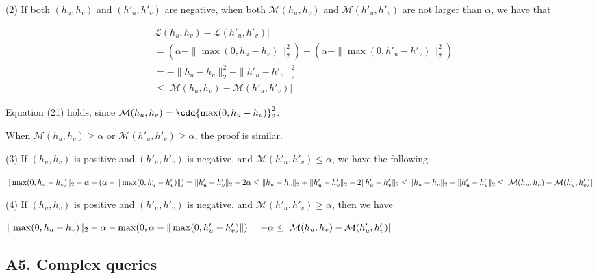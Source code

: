 \stab
(2) If both $(h_u,h_v)$ and $(h'_u,h'_v)$ are negative,
when both ${\mathcal M}(h_u,h_v)$
and ${\mathcal M}(h'_u,h'_v)$ are not larger than 
$\alpha$, we have that 

\begin{align*}
&{\mathcal L}(h_u,h_v)-{\mathcal L}(h'_u,h'_v)|\\
&=(\alpha -\|\max(0,h_u-h_v)\|^2_2) - (\alpha - \|\max(0,h'_u-h'_v)\|^2_2)\\
&=-\|h_u-h_v\|^2_2 + \|h'_u-h'_v\|^2_2 \\
&\leq |{\mathcal M}(h_u,h_v)-{\mathcal M}(h'_u,h'_v)| \tag{21}
\end{align*}

Equation (21) holds, since 
$\mathcal{M}(h_u, h_v) = \cdd{\max(0, h_u-h_v)}_2^2$.

\vspace{2ex}
When ${\mathcal M}(h_u,h_v)\geq \alpha$ or
 ${\mathcal M}(h'_u,h'_v)\geq  \alpha$,
 the proof is similar.











\stab
(3) If $(h_u,h_v)$ is positive and $(h'_u,h'_v)$ is negative,
and ${\mathcal M}(h'_u,h'_v)\leq \alpha$, we have the following

$\|\max(0,h_u - h_v)\|_2 - \alpha  - (\alpha - \|\max(0,h'_u - h'_v)\|)\\
=   \|h'_u - h'_v \|_2- 2\alpha\\
\leq \|h_u - h_v\|_2 +  \|h'_u - h'_v\|_2- 2\|h'_u - h'_v \|_2\\
\leq \|h_u - h_v\|_2 - \|h'_u - h'_v \|_2\\
\leq |{\mathcal M}(h_u,h_v)-{\mathcal M}(h'_u,h'_v)|$





\stab
(4) If $(h_u,h_v)$ is positive and $(h'_u,h'_v)$ is negative,
and ${\mathcal M}(h'_u,h'_v)\geq \alpha$, then 
we have 

$
\|\max(0,h_u - h_v)\|_2 - \alpha  - \max(0,\alpha - \|\max(0,h'_u - h'_v)\|)\\
= - \alpha\\
\leq |{\mathcal M}(h_u,h_v)-{\mathcal M}(h'_u,h'_v)|$

\subsection*{A5. Complex queries}


